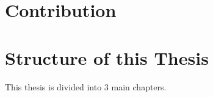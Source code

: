 \section{Contribution}
\section{Structure of this Thesis}
This thesis is divided into 3 main chapters.
